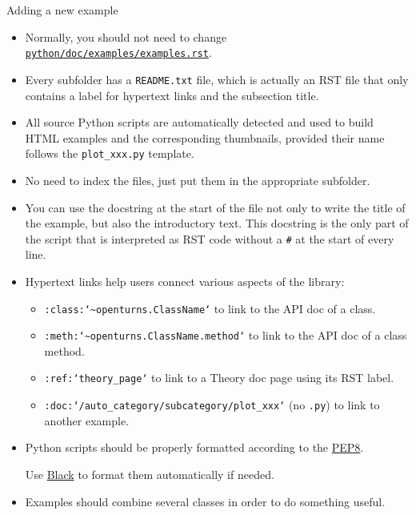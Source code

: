 \documentclass[8pt]{beamer}
\begin{document}
\begin{frame}{Adding a new example}
\begin{itemize}
    \item Normally, you should not need to change \href{https://github.com/openturns/openturns/blob/master/python/doc/examples/examples.rst}{\texttt{python/doc/examples/examples.rst}}.
    \item Every subfolder has a \alert{\texttt{README.txt}} file, which is actually an RST file that only contains a label for hypertext links and the subsection title.
    \item All source Python scripts are \alert{automatically detected} and used to build HTML examples and the corresponding thumbnails, provided their name follows the \texttt{plot\_xxx.py} template.
    \item \alert{No need to index the files}, just put them in the appropriate subfolder.
    \item You can use the \alert{docstring} at the start of the file not only to write the title of the example, but also the introductory text. This docstring is the only part of the script that is interpreted as RST code without a \alert{\texttt{\#}} at the start of every line.
    \item \alert{Hypertext links} help users connect various aspects of the library:
    \begin{itemize}
        \item \texttt{:class:`\textasciitilde openturns.ClassName`} to link to the API doc of a class.
        \item \texttt{:meth:`\textasciitilde openturns.ClassName.method`} to link to the API doc of a class method.
        \item \texttt{:ref:`theory\_page`} to link to a Theory doc page using its RST label.
        \item \texttt{:doc:`/auto\_category/subcategory/plot\_xxx`} (no \texttt{.py}) to link to another example.
    \end{itemize}
    \item Python scripts should be properly
    formatted according to the \href{https://www.python.org/dev/peps/pep-0008/}{\alert{PEP8}}.

    Use \href{https://github.com/psf/black}{\alert{Black}} to format them automatically if needed.
    \item  Examples should \alert{combine several classes} in order to \alert{do something useful}.
\end{itemize}
\end{frame}
\end{document}
